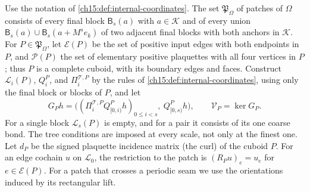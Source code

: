 \begin{definition}\label{ch15:def:patches}
Use the notation of \cref{ch15:def:internal-coordinates}. The set $\mathfrak P_\Omega$ of patches of $\Omega$ consists of every final block $\mathsf B_s(a)$ with $a\in\mathcal K$ and of every union $\mathsf B_s(a)\cup\mathsf B_s(a+M^se_k)$ of two adjacent final blocks with both anchors in $\mathcal K$. For $P\in\mathfrak P_\Omega$, let $\mathcal E(P)$ be the set of positive input edges with both endpoints in $P$, and $\mathcal P(P)$ the set of elementary positive plaquettes with all four vertices in $P$; thus $P$ is a complete cuboid, with its boundary edges and faces. Construct $\mathcal L_i(P)$, $Q^P_i$, and $\Pi^{\mathcal T,P}_i$ by the rules of \cref{ch15:def:internal-coordinates}, using only the final block or blocks of $P$, and let
\begin{equation}\label{ch15:eq:patch-constraints}
 G_P h=\bigl((\Pi^{\mathcal T,P}_iQ^P_{[0,i)}h)_{0\le i<s},\ Q^P_{[0,s)}h\bigr),\qquad
 \mathcal V_P=\ker G_P .
\end{equation}
For a single block $\mathcal L_s(P)$ is empty, and for a pair it consists of its one coarse bond. The tree conditions are imposed at every scale, not only at the finest one. Let $d_P$ be the signed plaquette incidence matrix (the curl) of the cuboid $P$. For an edge cochain $u$ on $\mathcal L_0$, the restriction to the patch is $(R_Pu)_e=u_e$ for $e\in\mathcal E(P)$. For a patch that crosses a periodic seam we use the orientations induced by its rectangular lift.
\end{definition}

